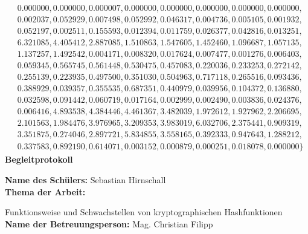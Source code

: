 \documentclass[12pt,a4paper]{scrartcl}
\numberwithin{equation}{section}
\numberwithin{myalgctr}{section}
\numberwithin{mytheoremctr}{section}
\begin{document}
\begin{align*}
					&0.000000,0.000000,0.000007,0.000000,0.000000,0.000000,0.000000,0.000000,\\
					&0.002037,0.052929,0.007498,0.052992,0.046317,0.004736,0.005105,0.001932,\\
					&0.052197,0.002511,0.155593,0.012394,0.011759,0.026377,0.042816,0.013251,\\
					&6.321085,4.405412,2.887085,1.510863,1.547605,1.452460,1.096687,1.057135,\\
					&1.137257,1.492542,0.004171,0.008320,0.017624,0.007477,0.001276,0.006403,\\
					&0.059345,0.565745,0.561448,0.530475,0.457083,0.220036,0.233253,0.272142,\\
					&0.255139,0.223935,0.497500,0.351030,0.504963,0.717118,0.265516,0.093436,\\
					&0.388929,0.039357,0.355535,0.687351,0.440979,0.039956,0.104372,0.136880,\\
					&0.032598,0.091442,0.060719,0.017164,0.002999,0.002490,0.003836,0.024376,\\
					&0.006416,4.893538,4.384446,4.461367,3.482039,1.972612,1.927962,2.206695,\\
					&2.101563,1.984476,3.976965,3.209353,3.983019,6.032706,2.375441,0.909319,\\
					&3.351875,0.274046,2.897721,5.834855,3.558165,0.392333,0.947643,1.288212,\\
					&0.337583,0.892190,0.614071,0.003152,0.000879,0.000251,0.018078,0.000000\}
	\end{align*}
	\newpage
	\thispagestyle{firststyle}\noindent
	{\huge \bfseries Begleitprotokoll}
	\newline
	\par\noindent
	\textbf{Name des Schülers:} Sebastian Hirnschall\\
	\textbf{Thema der Arbeit:}\par Funktionsweise und Schwachstellen von kryptographischen Hashfunktionen\\
	\textbf{Name der Betreuungsperson:} Mag. Christian Filipp\\
	
\end{document}
